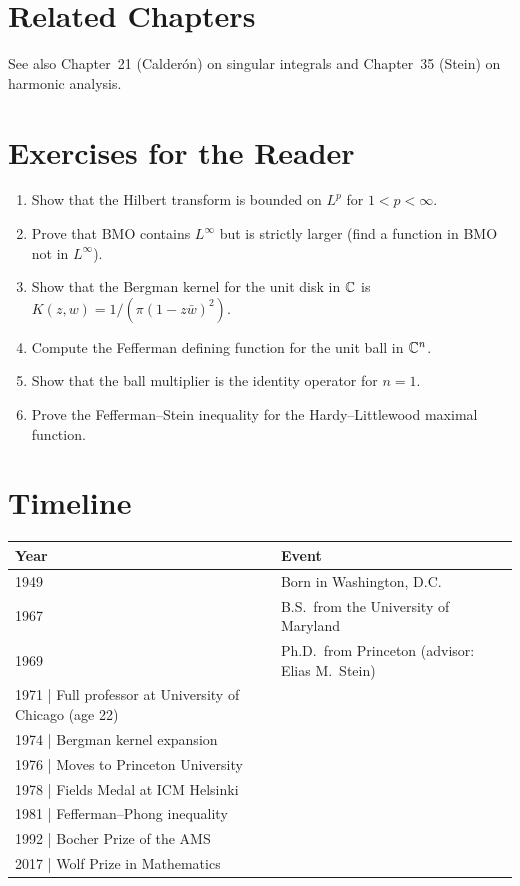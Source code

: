 \section{Related Chapters}
See also Chapter~21 (Calderón) on singular integrals and Chapter~35 (Stein) on harmonic analysis.

\section*{Exercises for the Reader}

\begin{enumerate}
    \item [I] Show that the Hilbert transform is bounded on $L^p$ for $1 < p < \infty$.
    \item [B] Prove that BMO contains $L^\infty$ but is strictly larger (find a function in BMO not in $L^\infty$).
    \item [B] Show that the Bergman kernel for the unit disk in $\mathbb{C}$ is $K(z,w) = 1/(\pi(1 - z\bar w)^2)$.
    \item [I] Compute the Fefferman defining function for the unit ball in $\mathbb{C}^n$.
    \item [B] Show that the ball multiplier is the identity operator for $n = 1$.
    \item [I] Prove the Fefferman--Stein inequality for the Hardy--Littlewood maximal function.
\end{enumerate}

\section*{Timeline}

\begin{tabularx}{\linewidth}{|p{1.5cm}|>{\raggedright\arraybackslash}X|}
\hline
\textbf{Year} & \textbf{Event} \\ \hline
1949 & Born in Washington, D.C. \\ \hline
1967 & B.S.\ from the University of Maryland \\ \hline
1969 & Ph.D.\ from Princeton (advisor: Elias M.\ Stein) \\ \hline
1971 | Full professor at University of Chicago (age 22) \\ \hline
1974 | Bergman kernel expansion \\ \hline
1976 | Moves to Princeton University \\ \hline
1978 | Fields Medal at ICM Helsinki \\ \hline
1981 | Fefferman--Phong inequality \\ \hline
1992 | Bocher Prize of the AMS \\ \hline
2017 | Wolf Prize in Mathematics \\ \hline
\end{tabularx}

